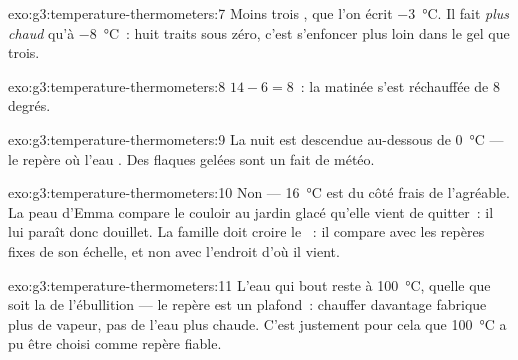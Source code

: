 \begin{solution}{exo:g3:temperature-thermometers:7}
Moins trois , que l'on écrit \qty{-3}{\celsius}. Il
fait \emph{plus chaud} qu'à \qty{-8}{\celsius}~: huit traits sous
zéro, c'est s'enfoncer plus loin dans le gel que trois.
\end{solution}

\begin{solution}{exo:g3:temperature-thermometers:8}
$14 - 6 = 8$~: la matinée s'est réchauffée de $8$ degrés.
\end{solution}

\begin{solution}{exo:g3:temperature-thermometers:9}
La nuit est descendue au-dessous de \qty{0}{\celsius} --- le repère
où l'eau . Des flaques gelées sont un  fait de météo.
\end{solution}

\begin{solution}{exo:g3:temperature-thermometers:10}
Non --- \qty{16}{\celsius} est du côté frais de l'agréable. La peau
d'Emma compare le couloir au jardin glacé qu'elle vient de quitter~:
il lui paraît donc douillet. La famille doit croire le ~:
il compare avec les repères fixes de son échelle, et non avec
l'endroit d'où il vient.
\end{solution}

\begin{solution}{exo:g3:temperature-thermometers:11}
L'eau qui bout reste à \qty{100}{\celsius}, quelle que soit la 
de l'ébullition --- le repère est un plafond~: chauffer davantage
fabrique plus de vapeur, pas de l'eau plus chaude. C'est justement
pour cela que \qty{100}{\celsius} a pu être choisi comme repère
fiable.
\end{solution}

